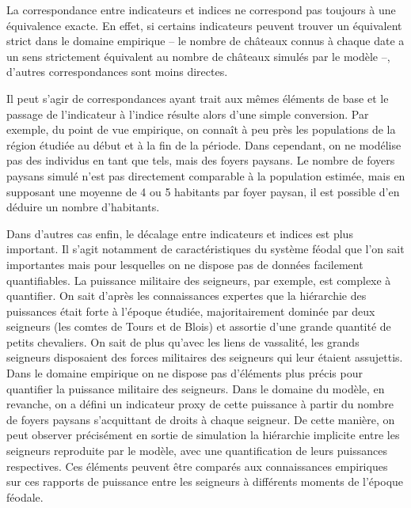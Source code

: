 La correspondance entre indicateurs et indices ne correspond pas toujours à une équivalence exacte.
En effet, si certains indicateurs peuvent trouver un équivalent strict dans le domaine empirique -- le nombre de châteaux connus à chaque date a un sens strictement équivalent au nombre de châteaux simulés par le modèle --, d'autres correspondances sont moins directes.

Il peut s'agir de correspondances ayant trait aux mêmes éléments de base et le passage de l'indicateur à l'indice résulte alors d'une simple conversion.
Par exemple, du point de vue empirique, on connaît à peu près les populations de la région étudiée au début et à la fin de la période.
Dans \simfeodal{} cependant, on ne modélise pas des individus en tant que tels, mais des foyers paysans.
Le nombre de foyers paysans simulé n'est pas directement comparable à la population estimée, mais en supposant une moyenne de 4 ou 5 habitants par foyer paysan, il est possible d'en déduire un nombre d'habitants.

Dans d'autres cas enfin, le décalage entre indicateurs et indices est plus important.
Il s'agit notamment de caractéristiques du système féodal que l'on sait importantes mais pour lesquelles on ne dispose pas de données facilement quantifiables.
La puissance militaire des seigneurs, par exemple, est complexe à quantifier.
On sait d'après les connaissances expertes que la hiérarchie des puissances était forte à l'époque étudiée, majoritairement dominée par deux seigneurs (les comtes de Tours et de Blois) et assortie d'une grande quantité de petits chevaliers.
On sait de plus qu'avec les liens de vassalité, les grands seigneurs disposaient des forces militaires des seigneurs qui leur étaient assujettis.
Dans le domaine empirique on ne dispose pas d'éléments plus précis pour quantifier la puissance militaire des seigneurs.
Dans le domaine du modèle, en revanche, on a défini un indicateur \og proxy\fg{} de cette puissance à partir du nombre de foyers paysans s'acquittant de droits à chaque seigneur.
De cette manière, on peut observer précisément en sortie de simulation la hiérarchie implicite entre les seigneurs reproduite par le modèle, avec une quantification de leurs puissances respectives.
Ces éléments peuvent être comparés aux connaissances empiriques sur ces rapports de puissance entre les seigneurs à différents moments de l'époque féodale.

